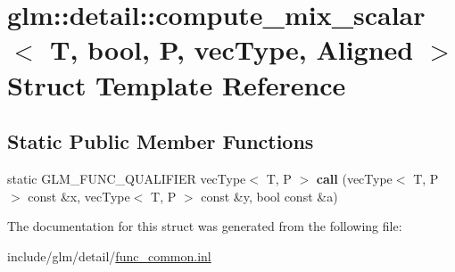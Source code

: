 \hypertarget{structglm_1_1detail_1_1compute__mix__scalar_3_01T_00_01bool_00_01P_00_01vecType_00_01Aligned_01_4}{}\section{glm\+:\+:detail\+:\+:compute\+\_\+mix\+\_\+scalar$<$ T, bool, P, vec\+Type, Aligned $>$ Struct Template Reference}
\label{structglm_1_1detail_1_1compute__mix__scalar_3_01T_00_01bool_00_01P_00_01vecType_00_01Aligned_01_4}
\subsection*{Static Public Member Functions}
\begin{DoxyCompactItemize}
\item 
\mbox{\label{structglm_1_1detail_1_1compute__mix__scalar_3_01T_00_01bool_00_01P_00_01vecType_00_01Aligned_01_4_a01419cd163f931e46a5b71d9ec7d40cb}} 
static G\+L\+M\+\_\+\+F\+U\+N\+C\+\_\+\+Q\+U\+A\+L\+I\+F\+I\+ER vec\+Type$<$ T, P $>$ {\bfseries call} (vec\+Type$<$ T, P $>$ const \&x, vec\+Type$<$ T, P $>$ const \&y, bool const \&a)
\end{DoxyCompactItemize}


The documentation for this struct was generated from the following file\+:\begin{DoxyCompactItemize}
\item 
include/glm/detail/\hyperlink{func__common_8inl}{func\+\_\+common.\+inl}\end{DoxyCompactItemize}
